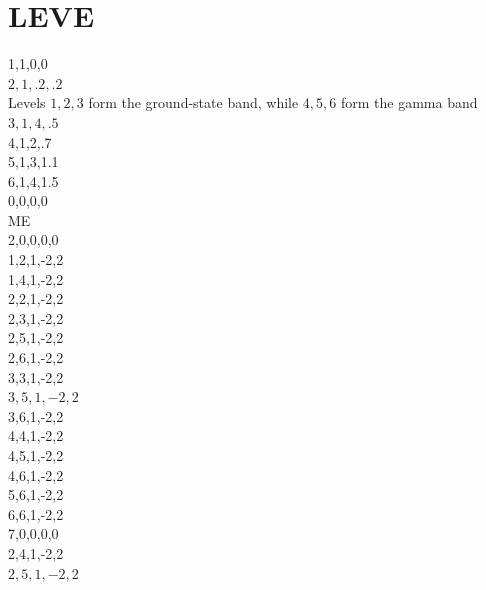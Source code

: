 \documentclass[10pt]{article}
\begin{document}
\section*{LEVE}
1,1,0,0\\
$2,1, .2, .2$\\
Levels $1,2,3$ form the ground-state band, while $4,5,6$ form the gamma band\\
$3,1,4, .5$\\
4,1,2,.7\\
5,1,3,1.1\\
6,1,4,1.5\\
0,0,0,0\\
ME\\
2,0,0,0,0\\
1,2,1,-2,2\\
1,4,1,-2,2\\
2,2,1,-2,2\\
2,3,1,-2,2\\
2,5,1,-2,2\\
2,6,1,-2,2\\
3,3,1,-2,2\\
$3,5,1,-2,2$\\
3,6,1,-2,2\\
4,4,1,-2,2\\
4,5,1,-2,2\\
4,6,1,-2,2\\
5,6,1,-2,2\\
6,6,1,-2,2\\
7,0,0,0,0\\
2,4,1,-2,2\\
$2,5,1,-2,2$
\end{document}
